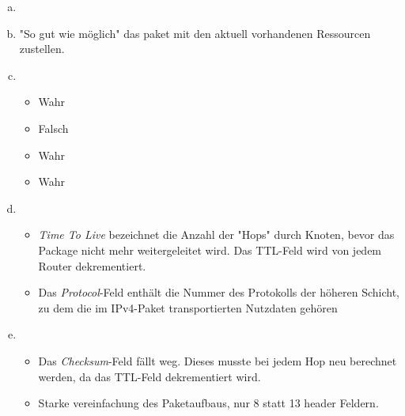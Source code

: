 

\usepackage{multicol,tabularx}
\usepackage{graphicx}
\usepackage{float}
\renewcommand{\arraystretch}{1.5}

\date{Mittwoch 4.12.2019}



\maketitle
\thispagestyle{fancy}


\begin{enumerate}[a)]
	\item \hfill 
		\begin{center}
			
		\end{center}

	\item "So gut wie möglich" das paket mit den aktuell vorhandenen Ressourcen zustellen.
	\item \begin{itemize}
		\item Wahr
		\item Falsch
		\item Wahr
		\item Wahr
	\end{itemize}
	\item \begin{itemize}
		\item \textit{Time To Live} bezeichnet die Anzahl der "Hops" durch Knoten, bevor das Package nicht mehr weitergeleitet wird. Das TTL-Feld wird von jedem Router dekrementiert.
		\item Das \textit{Protocol}-Feld enthält die Nummer des Protokolls der höheren Schicht, zu dem die im IPv4-Paket transportierten Nutzdaten gehören
	\end{itemize}
	\item \begin{itemize}
		\item Das \textit{Checksum}-Feld fällt weg. Dieses musste bei jedem Hop neu berechnet werden, da das TTL-Feld dekrementiert wird.
		\item Starke vereinfachung des Paketaufbaus, nur 8 statt 13 header Feldern.
	\end{itemize}
\end{enumerate}



